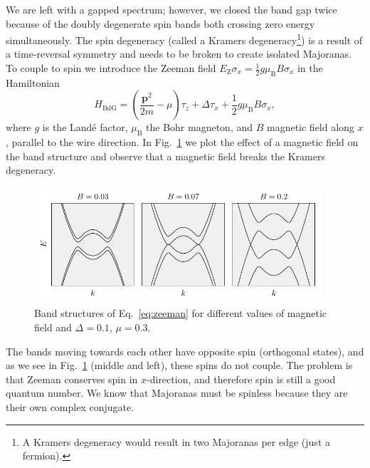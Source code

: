 We are left with a gapped spectrum; however, we closed the band gap twice because of the doubly degenerate spin bands both crossing zero energy simultaneously.
The spin degeneracy (called a Kramers degeneracy\footnote{A Kramers degeneracy would result in two Majoranas per edge (just a fermion).}) is a result of a time-reversal symmetry and needs to be broken to create isolated Majoranas.
To couple to spin we introduce the Zeeman field $E_\textrm{Z}\sigma_{x}=\frac{1}{2}g\mu_{\textrm{B}}B\sigma_{x}$ in the Hamiltonian
\begin{equation}
H_{\textrm{BdG}}=\left(\frac{\bm{p}^{2}}{2m}-\mu\right)\tau_{z}+\Delta\tau_{x}+\frac{1}{2}g\mu_{\textrm{B}}B\sigma_{x},\label{eq:zeeman}
\end{equation}
where $g$ is the Landé factor, $\mu_{\textrm{B}}$ the Bohr magneton, and $B$ magnetic field along $x$, parallel to the wire direction.
In Fig.~\ref{fig:zeeman} we plot the effect of a magnetic field on the band structure and observe that a magnetic field breaks the Kramers degeneracy.
\begin{figure}
\begin{center}
\includegraphics[width=0.95\textwidth]{chapter_introduction/figures/zeeman.pdf}
\caption{Band structures of Eq.~\eqref{eq:zeeman} for different values of magnetic field and $\Delta=0.1$, $\mu=0.3$.
\label{fig:zeeman}}
\end{center}
\end{figure}
The bands moving towards each other have opposite spin (orthogonal states), and as we see in Fig.~\ref{fig:zeeman} (middle and left), these spins do not couple.
The problem is that Zeeman conserves spin in $x$-direction, and therefore spin is still a good quantum number.
We know that Majoranas must be spinless because they are their own complex conjugate.

